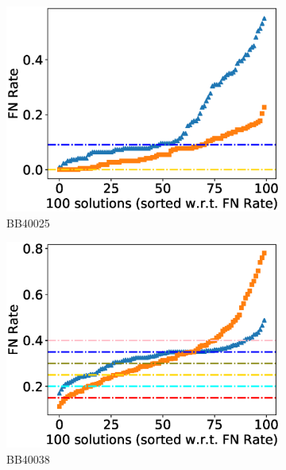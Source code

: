 \begin{figure}[!htbp]
\begin{adjustwidth}{-1cm}{-1cm}
		\begin{subfigure}{0.22\textwidth}
			\includegraphics[width=\columnwidth]{Figure/summary/precomputedInit/Balibase/BB40025_fnrate_density_single_run}
			\caption{BB40025}
		\end{subfigure}
		\begin{subfigure}{0.22\textwidth}
			\includegraphics[width=\columnwidth]{Figure/summary/precomputedInit/Balibase/BB40038_fnrate_density_single_run}
			\caption{BB40038}
		\end{subfigure}
		\begin{subfigure}{0.22\textwidth}

\end{subfigure}
\end{adjustwidth}
\end{figure}
